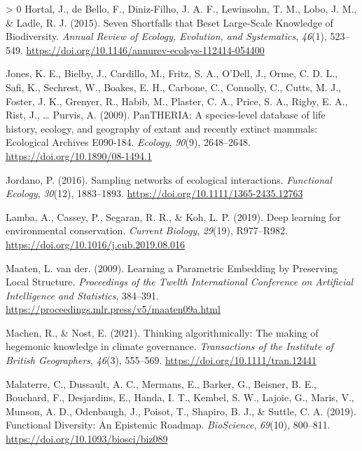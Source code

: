 \documentclass[11pt]{article}
\newlength{\cslhangindent}
\newenvironment{CSLReferences}[3] %
 {%
  \setlength{\parindent}{0pt}
  \ifodd #1 \everypar{\setlength{\hangindent}{\cslhangindent}}\ignorespaces\fi
  \ifnum #2 > 0
  \setlength{\parskip}{#2\baselineskip}
  \fi
 }%
 {}
\begin{document}
\begin{CSLReferences}{1}{0}
\leavevmode\hypertarget{ref-Hortal2015SevSho}{}%
Hortal, J., de Bello, F., Diniz-Filho, J. A. F., Lewinsohn, T. M., Lobo,
J. M., \& Ladle, R. J. (2015). Seven Shortfalls that Beset Large-Scale
Knowledge of Biodiversity. \emph{Annual Review of Ecology, Evolution,
and Systematics}, \emph{46}(1), 523--549.
\url{https://doi.org/10.1146/annurev-ecolsys-112414-054400}

\leavevmode\hypertarget{ref-Jones2009PanSpe}{}%
Jones, K. E., Bielby, J., Cardillo, M., Fritz, S. A., O'Dell, J., Orme,
C. D. L., Safi, K., Sechrest, W., Boakes, E. H., Carbone, C., Connolly,
C., Cutts, M. J., Foster, J. K., Grenyer, R., Habib, M., Plaster, C. A.,
Price, S. A., Rigby, E. A., Rist, J., \ldots{} Purvis, A. (2009).
PanTHERIA: A species‐level database of life history, ecology, and
geography of extant and recently extinct mammals: Ecological Archives
E090‐184. \emph{Ecology}, \emph{90}(9), 2648--2648.
\url{https://doi.org/10.1890/08-1494.1}

\leavevmode\hypertarget{ref-Jordano2016SamNet}{}%
Jordano, P. (2016). Sampling networks of ecological interactions.
\emph{Functional Ecology}, \emph{30}(12), 1883--1893.
\url{https://doi.org/10.1111/1365-2435.12763}

\leavevmode\hypertarget{ref-Lamba2019DeeLea}{}%
Lamba, A., Cassey, P., Segaran, R. R., \& Koh, L. P. (2019). Deep
learning for environmental conservation. \emph{Current Biology},
\emph{29}(19), R977--R982.
\url{https://doi.org/10.1016/j.cub.2019.08.016}

\leavevmode\hypertarget{ref-Maaten2009LeaPar}{}%
Maaten, L. van der. (2009). Learning a Parametric Embedding by
Preserving Local Structure. \emph{Proceedings of the Twelth
International Conference on Artificial Intelligence and Statistics},
384--391. \url{https://proceedings.mlr.press/v5/maaten09a.html}

\leavevmode\hypertarget{ref-Machen2021ThiAlg}{}%
Machen, R., \& Nost, E. (2021). Thinking algorithmically: The making of
hegemonic knowledge in climate governance. \emph{Transactions of the
Institute of British Geographers}, \emph{46}(3), 555--569.
\url{https://doi.org/10.1111/tran.12441}

\leavevmode\hypertarget{ref-Malaterre2019FunDiv}{}%
Malaterre, C., Dussault, A. C., Mermans, E., Barker, G., Beisner, B. E.,
Bouchard, F., Desjardins, E., Handa, I. T., Kembel, S. W., Lajoie, G.,
Maris, V., Munson, A. D., Odenbaugh, J., Poisot, T., Shapiro, B. J., \&
Suttle, C. A. (2019). Functional Diversity: An Epistemic Roadmap.
\emph{BioScience}, \emph{69}(10), 800--811.
\url{https://doi.org/10.1093/biosci/biz089}


\end{CSLReferences}
\end{document}
